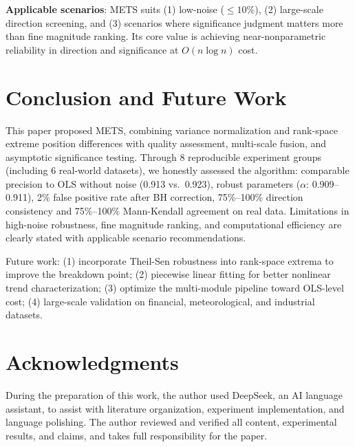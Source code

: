 \documentclass[11pt]{article}
\begin{document}
\textbf{Applicable scenarios}: METS suits (1) low-noise ($\le 10\%$), (2) large-scale direction screening, and (3) scenarios where significance judgment matters more than fine magnitude ranking. Its core value is achieving near-nonparametric reliability in direction and significance at $O(n \log n)$ cost.

\section{Conclusion and Future Work}
This paper proposed METS, combining variance normalization and rank-space extreme position differences with quality assessment, multi-scale fusion, and asymptotic significance testing. Through 8 reproducible experiment groups (including 6 real-world datasets), we honestly assessed the algorithm: comparable precision to OLS without noise (0.913 vs.\ 0.923), robust parameters ($\alpha$: 0.909--0.911), 2\% false positive rate after BH correction, 75\%--100\% direction consistency and 75\%--100\% Mann-Kendall agreement on real data. Limitations in high-noise robustness, fine magnitude ranking, and computational efficiency are clearly stated with applicable scenario recommendations.

Future work: (1) incorporate Theil-Sen robustness into rank-space extrema to improve the breakdown point; (2) piecewise linear fitting for better nonlinear trend characterization; (3) optimize the multi-module pipeline toward OLS-level cost; (4) large-scale validation on financial, meteorological, and industrial datasets.

\section*{Acknowledgments}
During the preparation of this work, the author used DeepSeek, an AI language assistant, to assist with literature organization, experiment implementation, and language polishing. The author reviewed and verified all content, experimental results, and claims, and takes full responsibility for the paper.
\end{document}
